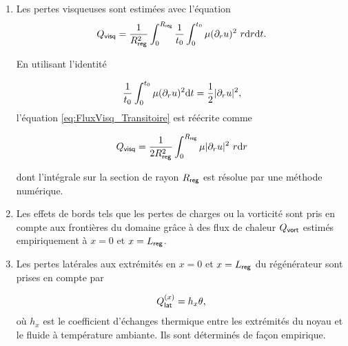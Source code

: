 \begin{enumerate}[label=\textbf{(\roman*)}]
\item Les pertes visqueuses sont estimées avec l'équation
\begin{equation}
Q_{\sf visq} = \frac{1}{R_{\sf reg}^2} \int_{0}^{R_{\sf reg}} \frac{1}{t_0} \int_0^{t_0} \mu (\partial_r u)^2\ r \deriv r \deriv t.
\label{eq:FluxVisq_Transitoire}
\end{equation}

En utilisant l'identité

\begin{equation*}
\frac{1}{t_0}\int_{0}^{t_0}\mu(\partial_r u)^2\mathrm{d} t = \frac12|\partial_r u|^2,
\end{equation*}
l'équation \eqref{eq:FluxVisq_Transitoire} est réécrite comme

\begin{equation}
	Q_{\sf visq} = \frac{1}{2R_{\sf reg}^2} \int_{0}^{R_{\sf reg}} \mu |\partial_r u|^2\ r \mathrm{d} r
	\label{eq:FluxVisq_Transitoire_IntegralTSimplifie}
\end{equation}

dont l'intégrale sur la section de rayon $R_{\sf reg}$ est résolue par une méthode numérique.

\item Les effets de bords tels que les pertes de charges ou la vorticité sont pris en compte aux frontières du domaine grâce à des flux de chaleur $Q_{\sf vort}$ estimés empiriquement à $x=0$ et $x=L_{\sf reg}$.

\item Les pertes latérales aux extrémités en $x=0$ et $x=L_{\sf reg}$ du régénérateur sont prises en compte par

\begin{equation}
	Q_{\sf lat}^{(x)} = h_x \theta,
	\label{eq:FluxLat_Transitoire}
\end{equation}
où $h_x$ est le coefficient d'échanges thermique entre les extrémités du noyau et le fluide à température ambiante. Ils sont déterminés de façon empirique.

%
%



\end{enumerate}
